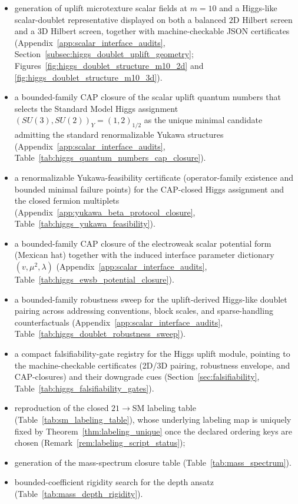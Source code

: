 \begin{itemize}
\item \AuditTag generation of uplift microtexture scalar fields at $m=10$ and a Higgs-like scalar-doublet representative displayed on both a balanced $2$D Hilbert screen and a $3$D Hilbert screen, together with machine-checkable JSON certificates (Appendix~\ref{app:scalar_interface_audits}, Section~\ref{subsec:higgs_doublet_uplift_geometry}; Figures~\ref{fig:higgs_doublet_structure_m10_2d} and \ref{fig:higgs_doublet_structure_m10_3d}).
\item \AuditTag a bounded-family CAP closure of the scalar uplift quantum numbers that selects the Standard Model Higgs assignment $(SU(3),SU(2))_Y=(1,2)_{1/2}$ as the unique minimal candidate admitting the standard renormalizable Yukawa structures (Appendix~\ref{app:scalar_interface_audits}, Table~\ref{tab:higgs_quantum_numbers_cap_closure}).
\item \AuditTag a renormalizable Yukawa-feasibility certificate (operator-family existence and bounded minimal failure points) for the CAP-closed Higgs assignment and the closed fermion multiplets (Appendix~\ref{app:yukawa_beta_protocol_closure}, Table~\ref{tab:higgs_yukawa_feasibility}).
\item \AuditTag a bounded-family CAP closure of the electroweak scalar potential form (Mexican hat) together with the induced interface parameter dictionary $(v,\mu^2,\lambda)$ (Appendix~\ref{app:scalar_interface_audits}, Table~\ref{tab:higgs_ewsb_potential_closure}).
\item \AuditTag a bounded-family robustness sweep for the uplift-derived Higgs-like doublet pairing across addressing conventions, block scales, and sparse-handling counterfactuals (Appendix~\ref{app:scalar_interface_audits}, Table~\ref{tab:higgs_doublet_robustness_sweep}).
\item \AuditTag a compact falsifiability-gate registry for the Higgs uplift module, pointing to the machine-checkable certificates (2D/3D pairing, robustness envelope, and CAP-closures) and their downgrade cues (Section~\ref{sec:falsifiability}, Table~\ref{tab:higgs_falsifiability_gates}).
\item reproduction of the closed $21\to$SM labeling table (Table~\ref{tab:sm_labeling_table}), whose underlying labeling map is uniquely fixed by Theorem~\ref{thm:labeling_unique} once the declared ordering keys are chosen (Remark~\ref{rem:labeling_script_status});
\item generation of the mass-spectrum closure table (Table~\ref{tab:mass_spectrum}).
\item bounded-coefficient rigidity search for the depth ansatz (Table~\ref{tab:mass_depth_rigidity}).

\end{itemize}
